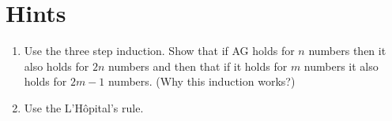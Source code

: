 \documentclass[11pt,a5paper]{article}
\begin{document}
\section{Hints}
\begin{enumerate}
	\subsection*{Easy}

	\subsection*{Medium}
	
	\subsection*{Difficult}

	\subsection*{Extra}	
	\item{Use the three step induction. Show that if AG holds for $n$ 
	numbers then it also holds for $2n$ numbers and then that if it 
	holds for $m$ numbers it also holds for $2m-1$ numbers. (Why this 
	induction works?)}
	
	\item{Use the L'Hôpital's rule.}
\end{enumerate}
\end{document}
